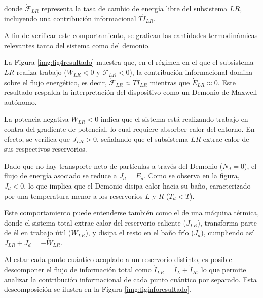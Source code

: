 donde \( \dot{\mathcal{F}}_{LR} \) representa la tasa de cambio de energía libre del subsistema \( LR \), incluyendo una contribución informacional \( T\dot{I}_{LR} \).

A fin de verificar este comportamiento, se grafican las cantidades termodinámicas relevantes tanto del sistema como del demonio.



La Figura \ref{img:fig4resultado} muestra que, en el régimen en el que el subsistema $LR$ realiza trabajo ($\dot{W}_{LR} < 0$ y $\dot{\mathcal{F}}_{LR} < 0$), la contribución informacional domina sobre el flujo energético, es decir, $\dot{\mathcal{F}}_{LR} \approx T \dot{I}_{LR}$ mientras que $\dot{E}_{LR} \approx 0$. Este resultado respalda la interpretación del dispositivo como un Demonio de Maxwell autónomo.

La potencia negativa $\dot{W}_{LR} < 0$ indica que el sistema está realizando trabajo en contra del gradiente de potencial, lo cual requiere absorber calor del entorno. En efecto, se verifica que $J_{LR} > 0$, señalando que el subsistema $LR$ extrae calor de sus respectivos reservorios.

Dado que no hay transporte neto de partículas a través del Demonio ($\dot{N}_{d} = 0$), el flujo de energía asociado se reduce a $J_{d} = \dot{E}_{d}$. Como se observa en la figura, $J_{d} < 0$, lo que implica que el Demonio disipa calor hacia su baño, caracterizado por una temperatura menor a los reservorios $L$ y $R$ ($T_d < T$). 

Este comportamiento puede entenderse también como el de una máquina térmica, donde el sistema total extrae calor del reservorio caliente ($J_{LR}$), transforma parte de él en trabajo útil ($\dot{W}_{LR}$), y disipa el resto en el baño frío ($J_{d}$), cumpliendo así $J_{LR} + J_{d} = -\dot{W}_{LR}$.

Al estar cada punto cuántico acoplado a un reservorio distinto, es posible descomponer el flujo de información total como $\dot{I}_{LR} = \dot{I}_{L} + \dot{I}_{R}$, lo que permite analizar la contribución informacional de cada punto cuántico por separado. Esta descomposición se ilustra en la Figura \ref{img:figinforesultado}.


